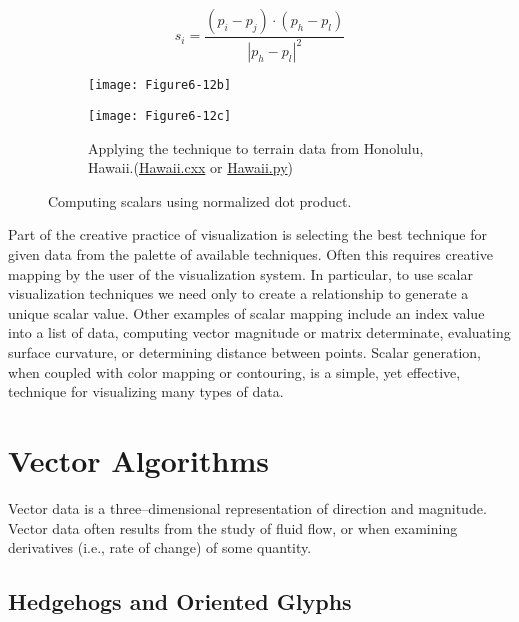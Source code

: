 \begin{figure}[htb]
	\begin{subfigure}[h]{0.48\linewidth}
		\begin{equation*}
			s_i = \frac{(p_i-p_j) \cdot (p_h-p_l)}{|p_h-p_l|^2}
		\end{equation*}
	\end{subfigure}
	\begin{subfigure}[h]{0.48\linewidth}
	\texttt{[image: Figure6-12b]}
	\end{subfigure}
	\hfill
	\begin{subfigure}[h]{0.48\linewidth}
		\texttt{[image: Figure6-12c]}
		\caption*{Applying the technique to terrain data from Honolulu, Hawaii.(\href{https://lorensen.github.io/VTKExamples/site/Cxx/Visualization/Hawaii}{Hawaii.cxx} or \href{https://lorensen.github.io/VTKExamples/site/Python/Visualization/Hawaii/}{Hawaii.py})}
	\end{subfigure}%
	\caption{Computing scalars using normalized dot product.}\label{fig:Figure6-12}
\end{figure}

Part of the creative practice of visualization is selecting the best technique for given data from the palette of available techniques. Often this requires creative mapping by the user of the visualization system. In particular, to use scalar visualization techniques we need only to create a relationship to generate a unique scalar value. Other examples of scalar mapping include an index value into a list of data, computing vector magnitude or matrix determinate, evaluating surface curvature, or determining distance between points. Scalar generation, when coupled with color mapping or contouring, is a simple, yet effective, technique for visualizing many types of data.

\section{Vector Algorithms}

Vector data is a three--dimensional representation of direction and magnitude. Vector data often results from the study of fluid flow, or when examining derivatives (i.e., rate of change) of some quantity.

\subsection{Hedgehogs and Oriented Glyphs}
\label{subsec:hedgehogs_oriented_glyphs}


